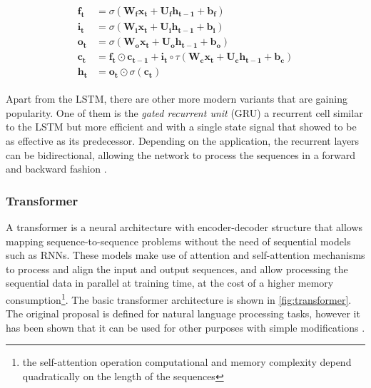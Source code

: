 \begin{align}
\label{eq:LSTM}
\begin{split}
	\mathbf{f_t} &= \sigma(\mathbf{W_f} \mathbf{x_t} + \mathbf{U_f} \mathbf{h_{t-1}} + \mathbf{b_f})\\
	\mathbf{i_t} &= \sigma(\mathbf{W_i} \mathbf{x_t} + \mathbf{U_i} \mathbf{h_{t-1}} + \mathbf{b_i})\\
	\mathbf{o_t} &= \sigma(\mathbf{W_o} \mathbf{x_t} + \mathbf{U_o} \mathbf{h_{t-1}} + \mathbf{b_o})\\
	\mathbf{c_t} &= \mathbf{f_t} \odot \mathbf{c_{t-1}} + \mathbf{i_t} \circ \tau (\mathbf{W_c} \mathbf{x_t} + \mathbf{U_c} \mathbf{h_{t-1}} + \mathbf{b_c})\\
	\mathbf{h_t} &= \mathbf{o_t} \odot \sigma(\mathbf{c_t})
\end{split}
\end{align}

Apart from the LSTM, there are other more modern variants that are gaining popularity. One of them is the \textit{gated recurrent unit} (GRU) \autocite{chung2014} a recurrent cell similar to the LSTM but more efficient and with a single state signal that showed to be as effective as its predecessor. Depending on the application, the recurrent layers can be bidirectional, allowing the network to process the sequences in a forward and backward fashion \autocite{schuster1997}.

\subsubsection{Transformer} \label{sec:transformer}
A transformer \autocite{vaswani2017} is a neural architecture with encoder-decoder structure that allows mapping sequence-to-sequence \autocite{sutskever2014} problems without the need of sequential models such as RNNs. These models make use of attention and self-attention mechanisms \autocite{bahdanau2015} to process and align the input and output sequences, and allow processing the sequential data in parallel at training time, at the cost of a higher memory consumption\footnote{the self-attention operation computational and memory complexity depend quadratically on the length of the sequences}. The basic transformer  architecture is shown in \ref{fig:transformer}. The original proposal is defined for natural language processing tasks, however it has been shown that it can be used for other purposes with simple modifications \autocite{naihan2019, jiarui2021, sanyuan2021}.

